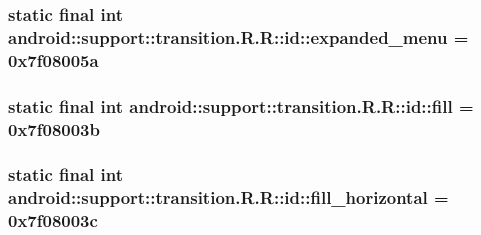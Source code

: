 \hypertarget{classandroid_1_1support_1_1transition_1_1_r_1_1id_ba1ac839796e9a5565cbdb2bd65743df}{
\subsubsection[{expanded\_\-menu}]{\setlength{\rightskip}{0pt plus 5cm}static final int android::support::transition.R.R::id::expanded\_\-menu = 0x7f08005a}}
\label{classandroid_1_1support_1_1transition_1_1_r_1_1id_ba1ac839796e9a5565cbdb2bd65743df}


\hypertarget{classandroid_1_1support_1_1transition_1_1_r_1_1id_7bba8c7aaeb55a0d896e7b49f9eb88ad}{
\subsubsection[{fill}]{\setlength{\rightskip}{0pt plus 5cm}static final int android::support::transition.R.R::id::fill = 0x7f08003b}}
\label{classandroid_1_1support_1_1transition_1_1_r_1_1id_7bba8c7aaeb55a0d896e7b49f9eb88ad}


\hypertarget{classandroid_1_1support_1_1transition_1_1_r_1_1id_465f5379b1a8a4c13498a07406386d20}{
\subsubsection[{fill\_\-horizontal}]{\setlength{\rightskip}{0pt plus 5cm}static final int android::support::transition.R.R::id::fill\_\-horizontal = 0x7f08003c}}
\label{classandroid_1_1support_1_1transition_1_1_r_1_1id_465f5379b1a8a4c13498a07406386d20}


